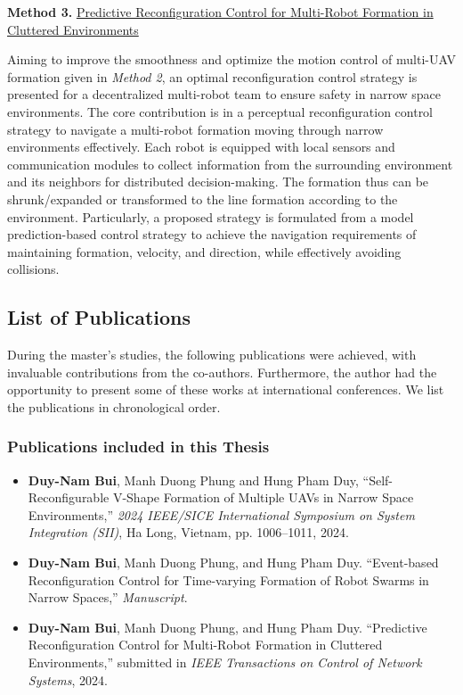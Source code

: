 \noindent \textbf{Method 3.} \hyperref[paper3]{Predictive Reconfiguration Control for Multi-Robot Formation in Cluttered Environments}

Aiming to improve the smoothness and optimize the motion control of multi-UAV formation given in \textit{Method 2}, an optimal reconfiguration control strategy is presented for a decentralized multi-robot team to ensure safety in narrow space environments. The core contribution is in a perceptual reconfiguration control strategy to navigate a multi-robot formation moving through narrow environments effectively. Each robot is equipped with local sensors and communication modules to collect information from the surrounding environment and its neighbors for distributed decision-making. The formation thus can be shrunk/expanded or transformed to the line formation according to the environment. Particularly, a proposed strategy is formulated from a model prediction-based control strategy to achieve the navigation requirements of maintaining formation, velocity, and direction, while effectively avoiding collisions.

\subsection{List of Publications}\label{sec22}
During the master's studies, the following publications were achieved, with invaluable contributions from the co-authors. Furthermore, the author had the opportunity to present some of these works at international conferences. We list the publications in chronological order.
\subsubsection{Publications included in this Thesis}
\begin{itemize}
    \item \textbf{Duy-Nam Bui}, Manh Duong Phung and Hung Pham Duy, ``Self-Reconfigurable V-Shape Formation of Multiple UAVs in Narrow Space Environments,'' \textit{2024 IEEE/SICE International Symposium on System Integration (SII)}, Ha Long, Vietnam, pp. 1006--1011, 2024.
        \item \textbf{Duy-Nam Bui}, Manh Duong Phung, and Hung Pham Duy. ``Event-based Reconfiguration Control for Time-varying Formation of Robot Swarms in Narrow Spaces,'' \textit{Manuscript}.
    \item \textbf{Duy-Nam Bui}, Manh Duong Phung, and Hung Pham Duy. ``Predictive Reconfiguration Control for Multi-Robot Formation in Cluttered Environments,'' submitted in \textit{IEEE Transactions on Control of Network Systems}, 2024.
\end{itemize}
